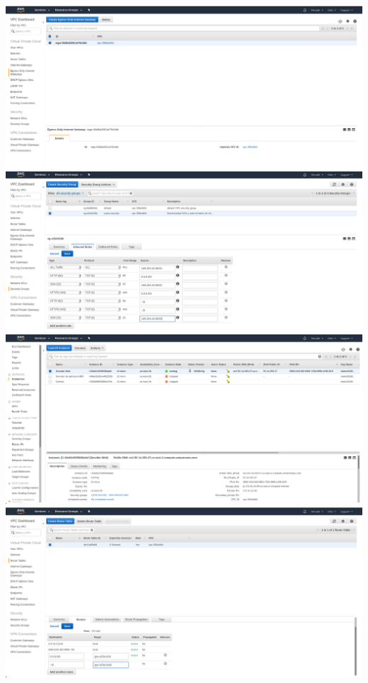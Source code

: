 \documentclass[9pt]{article}
\begin{document}
\includegraphics[width=\textwidth]{vpc_egress_only}
\includegraphics[width=\textwidth]{edit_security_group}
\includegraphics[width=\textwidth]{ipv6_assignment}
\includegraphics[width=\textwidth]{public_subnet}
\end{document}
